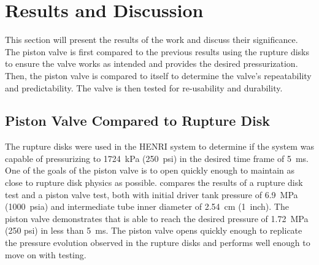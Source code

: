 \section{Results and Discussion} \label{s:results}
This section will present the results of the work and discuss their significance. The piston valve is first compared to the previous results using the rupture disks to ensure the valve works as intended and provides the desired pressurization. Then, the piston valve is compared to itself to determine the valve's repeatability and predictability. The valve is then tested for re-usability and durability.

\subsection{Piston Valve Compared to Rupture Disk} \label{s:disk v piston}
The rupture disks were used in the HENRI system to determine if the system was capable of pressurizing to \SI{1724}{\kilo\pascal} (\SI{250}{psi}) in the desired time frame of \SI{5}{\milli\second}\cite{HeNURETH}. One of the goals of the piston valve is to open quickly enough to maintain as close to rupture disk physics as possible. 
 compares the results of a rupture disk test and a piston valve test, both with initial driver tank pressure of \SI{6.9}{\mega\pascal} (\SI{1000}{psia}) and intermediate tube inner diameter of \SI{2.54}{\centi\meter} (\SI{1}{inch}). The piston valve demonstrates that is able to reach the desired pressure of \SI{1.72}{\mega\pascal} (250 psi) in less than \SI{5}{\milli\second}. The piston valve opens quickly enough to replicate the pressure evolution observed in the rupture disks and performs well enough to move on with testing.


